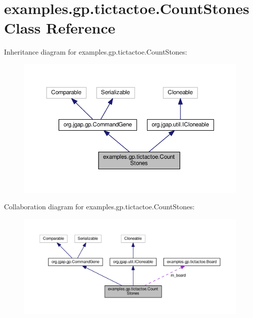 \hypertarget{classexamples_1_1gp_1_1tictactoe_1_1_count_stones}{\section{examples.\-gp.\-tictactoe.\-Count\-Stones Class Reference}
\label{classexamples_1_1gp_1_1tictactoe_1_1_count_stones}
}


Inheritance diagram for examples.\-gp.\-tictactoe.\-Count\-Stones\-:
\nopagebreak
\begin{figure}[H]
\begin{center}
\leavevmode
\includegraphics[width=350pt]{classexamples_1_1gp_1_1tictactoe_1_1_count_stones__inherit__graph}
\end{center}
\end{figure}


Collaboration diagram for examples.\-gp.\-tictactoe.\-Count\-Stones\-:
\nopagebreak
\begin{figure}[H]
\begin{center}
\leavevmode
\includegraphics[width=350pt]{classexamples_1_1gp_1_1tictactoe_1_1_count_stones__coll__graph}
\end{center}
\end{figure}
